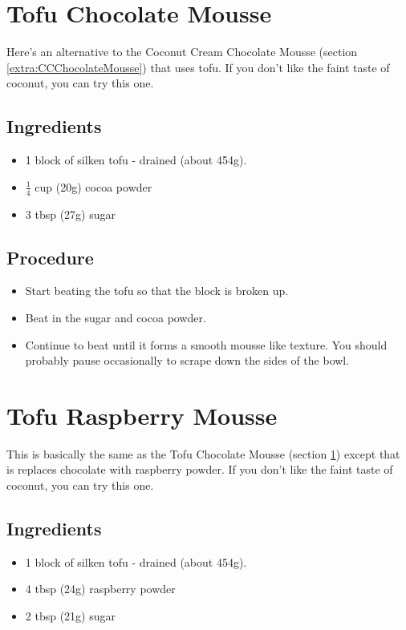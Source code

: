 \documentclass[10pt, openany]{book}
\begin{document}
\section{Tofu Chocolate Mousse}
\label{extra:TofuChocolateMousse}
Here's an alternative to the Coconut Cream Chocolate Mousse (section \ref{extra:CCChocolateMousse}) that uses tofu.  If you don't like the faint taste of coconut, you can try this one.
\subsection{Ingredients}
\begin{itemize}
  \item 1 block of silken tofu - drained (about 454g).
  \item $\frac{1}{4}$ cup (20g) cocoa powder
  \item 3 tbsp (27g) sugar
\end{itemize}
\subsection{Procedure}
\begin{itemize}
  \item Start beating the tofu so that the block is broken up.
  \item Beat in the sugar and cocoa powder.
  \item Continue to beat until it forms a smooth mousse like texture.  You should probably pause occasionally to scrape down the sides of the bowl.
\end{itemize}

\section{Tofu Raspberry Mousse}
\label{extra:TofuRaspberryMousse}
This is basically the same as the Tofu Chocolate Mousse (section \ref{extra:TofuChocolateMousse}) except that is replaces chocolate with raspberry powder.  If you don't like the faint taste of coconut, you can try this one.
\subsection{Ingredients}
\begin{itemize}
  \item 1 block of silken tofu - drained (about 454g).
  \item 4 tbsp (24g) raspberry powder
  \item 2 tbsp (21g) sugar
\end{itemize}
\end{document}
